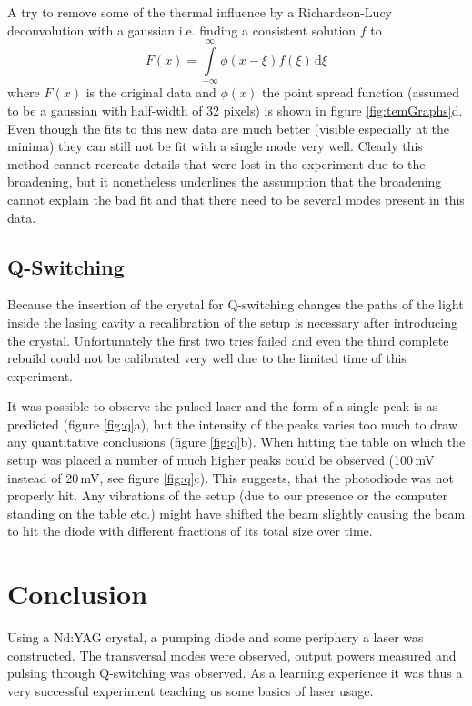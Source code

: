 \documentclass[a4paper]{scrartcl}
\numberwithin{equation}{section}
\numberwithin{figure}{section}
\numberwithin{table}{section}
\newcommand{\eq}[2]{\begin{equation}#1\label{#2}\end{equation}}
\begin{document}
A try to remove some of the thermal influence by a Richardson-Lucy deconvolution with a gaussian i.e. finding a consistent solution $f$ to 
\eq{F(x)=\int\limits_{-\infty}^{\infty}\!\!\phi(x-\xi) f(\xi) \, \text{d}\xi}{}
where $F(x)$ is the original data and $\phi(x)$ the point spread function (assumed to be a gaussian with half-width of 32 pixels) is shown in figure \ref{fig:temGraphs}d. Even though the fits to this new data are much better (visible especially at the minima) they can still not be fit with a single mode very well. Clearly this method cannot recreate details that were lost in the experiment due to the broadening, but it nonetheless underlines the assumption that the broadening cannot explain the bad fit and that there need to be several modes present in this data.




\subsection{Q-Switching}
Because the insertion of the crystal for Q-switching changes the paths of the light inside the lasing cavity a recalibration of the setup is necessary after introducing the crystal. Unfortunately the first two tries failed and even the third complete rebuild could not be calibrated very well due to the limited time of this experiment. 

It was possible to observe the pulsed laser and the form of a single peak is as predicted (figure \ref{fig:q}a), but the intensity of the peaks varies too much to draw any quantitative conclusions (figure \ref{fig:q}b). When hitting the table on which the setup was placed a number of much higher peaks could be observed (100\,mV instead of 20\,mV, see figure \ref{fig:q}c). This suggests, that the photodiode was not properly hit. Any vibrations of the setup (due to our presence or the computer standing on the table etc.) might have shifted the beam slightly causing the beam to hit the diode with different fractions of its total size over time.


\FloatBarrier
\section{Conclusion}
Using a Nd:YAG crystal, a pumping diode and some periphery a laser was constructed. The transversal modes were observed, output powers measured and pulsing through Q-switching was observed. As a learning experience it was thus a very successful experiment teaching us some basics of laser usage.
\end{document}
